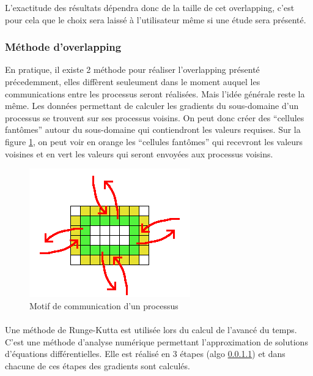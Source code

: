 L'exactitude des résultats dépendra donc de la taille de cet overlapping, c'est pour cela que le choix sera laissé à l'utilisateur même si une étude sera présenté.



\subsubsection{Méthode d'overlapping}
En pratique, il existe 2 méthode pour réaliser l'overlapping présenté précedemment, elles diffèrent seuleument dans le moment auquel les communications entre les processus seront réalisées. Mais l'idée générale reste la même. Les données permettant de calculer les gradients du sous-domaine d'un processus se trouvent sur ses processus voisins. On peut donc créer des ``cellules fantômes'' autour du sous-domaine qui contiendront les valeurs requises. Sur la figure \ref{fig:neighbor_buf}, on peut voir en orange les ``cellules fantômes'' qui recevront les valeurs voisines et en vert les valeurs qui seront envoyées aux processus voisins. 

\begin{figure}[h]
  \centering
  \includegraphics[scale=1]{figures/domain_overlap2.png}
  \caption{\label{fig:neighbor_buf}Motif de communication d'un processus}
\end{figure}



\paragraph{}Une méthode de Runge-Kutta est utilisée lors du calcul de l'avancé du temps. C'est une méthode d'analyse numérique permettant l'approximation de solutions d'équations différentielles. Elle est réalisé en 3 étapes (algo \ref{}) et dans chacune de ces étapes des gradients sont calculés.


